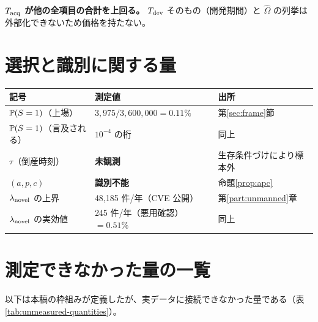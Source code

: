 \textbf{$T_{\rm acq}$ が他の全項目の合計を上回る。}
$T_{\rm dev}$ そのもの（開発期間）と $\hat\Omega$ の列挙は外部化できないため価格を持たない。

\section{選択と識別に関する量}

\begin{center}
\begin{tabularx}{\textwidth}{@{}llX@{}}
\toprule
記号 & 測定値 & 出所 \\
\midrule
$\mathbb{P}(S=1)$（上場） & $3{,}975 / 3{,}600{,}000 = 0.11\%$ & 第\ref{sec:frame}節 \\
$\mathbb{P}(S=1)$（言及される） & $10^{-4}$ の桁 & 同上 \\
$\tau$（倒産時刻） & \textbf{未観測} & 生存条件づけにより標本外 \\
$(a,p,c)$ & \textbf{識別不能} & 命題\ref{prop:apc} \\
$\lambda_{\rm novel}$ の上界 & 48,185 件/年（CVE 公開） & 第\ref{part:unmanned}章 \\
$\lambda_{\rm novel}$ の実効値 & 245 件/年（悪用確認）$=0.51\%$ & 同上 \\
\bottomrule
\end{tabularx}
\label{tab:selection-identification-measures}
\end{center}

\section{測定できなかった量の一覧}

以下は本稿の枠組みが定義したが、実データに接続できなかった量である（表\ref{tab:unmeasured-quantities}）。

